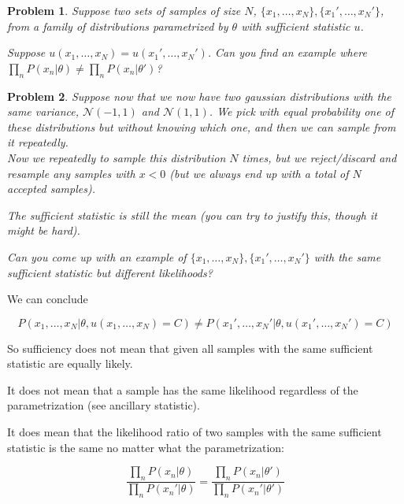 \documentclass[a4paper]{article}
\newtheorem{problem}{Problem}[section]
\begin{document}
\begin{problem}
Suppose two sets of samples of size $N$, $\{x_1,\ldots,x_N\},\{x_1',\ldots,x_N'\}$, from a family of distributions parametrized by $\theta$ with sufficient statistic $u$.

Suppose $u(x_1,\ldots,x_N) = u(x_1',\ldots,x_N')$.  Can you find an example where $ \prod_n P(x_n \vert \theta) \neq \prod_n P(x_n \vert \theta') $?
\end{problem}

\begin{problem}
  Suppose now that we now have two gaussian distributions with the same variance, $\mathcal{N}(-1,1)$ and $\mathcal{N}(1,1)$.  We pick with equal probability one of these distributions but without knowing which one, and then we can sample from it repeatedly. \\
Now we repeatedly to sample this distribution $N$ times, but we reject/discard and resample any samples with $x<0$ (but we always end up with a total of $N$ accepted samples).

The sufficient statistic is still the mean (you can try to justify this, though it might be hard).

Can you come up with an example of $\{x_1,\ldots,x_N\}, \{x_1',\ldots,x_N'\}$ with the same sufficient statistic but different likelihoods?
\end{problem}

We can conclude

\begin{equation}
  P( x_1, \ldots, x_N \vert \theta, u(x_1,\ldots,x_N) = C ) \neq P( x_1', \ldots, x_N' \vert \theta, u(x_1',\ldots,x_N') = C )
  \label{}
\end{equation}

So sufficiency does not mean that given all samples with the same sufficient statistic are equally likely.

It does not mean that a sample has the same likelihood regardless of the parametrization (see ancillary statistic).

It does mean that the likelihood ratio of two samples with the same sufficient statistic is the same no matter what the parametrization:

\begin{equation}
  \frac{\prod_n P(x_n \vert \theta) }{ \prod_n P( x_n' \vert \theta) } = \frac{\prod_n P( x_n \vert \theta') }{ \prod_n P( x_n' \vert \theta') }
  \label{}
\end{equation}
\end{document}

